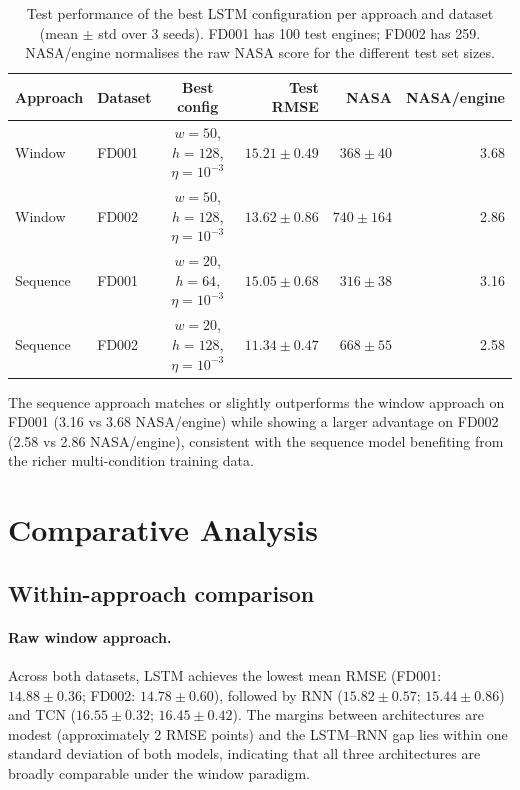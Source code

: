 \documentclass[a4paper,11pt]{article}
\begin{document}
\begin{table}[h]
    \centering
    \begin{tabular}{llcrrr}
        \hline
        Approach & Dataset & Best config & Test RMSE & NASA & NASA/engine \\
        \hline
        Window   & FD001 & $w=50$, $h=128$, $\eta=10^{-3}$ & $15.21 \pm 0.49$ & $368 \pm 40$  & 3.68 \\
        Window   & FD002 & $w=50$, $h=128$, $\eta=10^{-3}$ & $13.62 \pm 0.86$ & $740 \pm 164$ & 2.86 \\
        Sequence & FD001 & $w=20$, $h=64$,  $\eta=10^{-3}$ & $15.05 \pm 0.68$ & $316 \pm 38$  & 3.16 \\
        Sequence & FD002 & $w=20$, $h=128$, $\eta=10^{-3}$ & $11.34 \pm 0.47$ & $668 \pm 55$  & 2.58 \\
        \hline
    \end{tabular}
    \caption{Test performance of the best LSTM configuration per approach and dataset (mean $\pm$ std over 3 seeds). FD001 has 100 test engines; FD002 has 259. NASA/engine normalises the raw NASA score for the different test set sizes.}
    \label{tab:hparam_best}
\end{table}

The sequence approach matches or slightly outperforms the window approach on FD001 (3.16 vs 3.68 NASA/engine) while showing a larger advantage on FD002 (2.58 vs 2.86 NASA/engine), consistent with the sequence model benefiting from the richer multi-condition training data.


\section{Comparative Analysis}

\subsection{Within-approach comparison}

\paragraph{Raw window approach.}
Across both datasets, LSTM achieves the lowest mean RMSE (FD001: $14.88 \pm 0.36$; FD002: $14.78 \pm 0.60$), followed by RNN ($15.82 \pm 0.57$; $15.44 \pm 0.86$) and TCN ($16.55 \pm 0.32$; $16.45 \pm 0.42$).
The margins between architectures are modest (approximately 2 RMSE points) and the LSTM--RNN gap lies within one standard deviation of both models, indicating that all three architectures are broadly comparable under the window paradigm.
\end{document}
